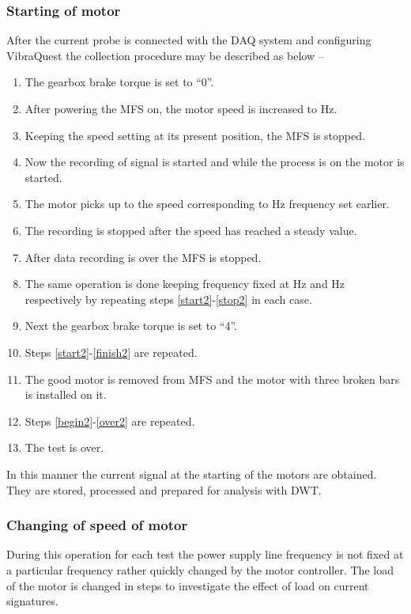 \documentclass[a4paper,11pt]{report}
\begin{document}
\subsubsection{Starting of motor}
After the current probe is connected with the DAQ system and configuring VibraQuest the collection procedure may be described as below -- 

\begin{enumerate}
\item The gearbox brake torque is set to ``0''. \label{begin2}
\item After powering the MFS on, the motor speed is increased to \unit[30]{Hz}. \label{start2}
\item Keeping the speed setting at its present position, the MFS is stopped. 
\item Now the recording of signal is started and while the process is on the motor is started.
\item The motor picks up to the speed corresponding to \unit[30]{Hz} frequency set earlier.
\item The recording is stopped after the speed has reached a steady value.
\item After data recording is over the MFS is stopped. \label{stop2}
\item The same operation is done keeping frequency fixed at \unit[40]{Hz} and \unit[50]{Hz} respectively by repeating steps \ref{start2}-\ref{stop2} in each case. \label{finish2}
\item Next the gearbox brake torque is set to ``4''.
\item Steps \ref{start2}-\ref{finish2} are repeated. \label{over2}
\item The good motor is removed from MFS and the motor with three broken bars is installed on it.
\item Steps \ref{begin2}-\ref{over2} are repeated.
\item The test is over.
\end{enumerate}

In this manner the current signal at the starting of the motors are obtained. They are stored, processed and prepared for analysis with DWT.

\subsubsection{Changing of speed of motor}
During this operation for each test the power supply line frequency is not fixed at a particular frequency rather quickly changed by the motor controller. The load of the motor is changed in steps to investigate the effect of load on current signatures.
\end{document}
